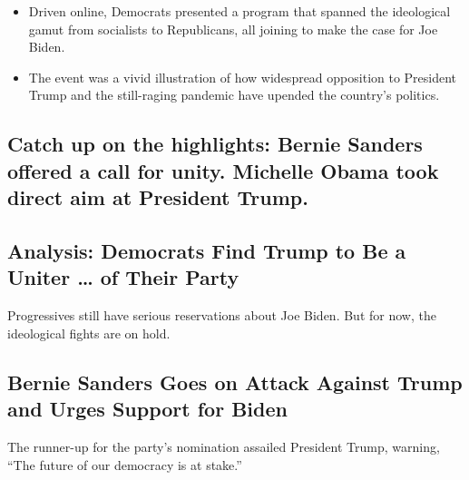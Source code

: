 \begin{itemize}
\tightlist
\item
  Driven online, Democrats presented a program that spanned the
  ideological gamut from socialists to Republicans, all joining to make
  the case for Joe Biden.
\item
  The event was a vivid illustration of how widespread opposition to
  President Trump and the still-raging pandemic have upended the
  country's politics.
\end{itemize}

\href{https://www.nytimes3xbfgragh.onion/live/2020/08/17/us/dnc-convention}{}

\hypertarget{catch-up-on-the-highlights-bernie-sanders-offered-a-call-for-unity-michelle-obama-took-direct-aim-at-president-trump}{%
\subsection{Catch up on the highlights: Bernie Sanders offered a call
for unity. Michelle Obama took direct aim at President
Trump.}\label{catch-up-on-the-highlights-bernie-sanders-offered-a-call-for-unity-michelle-obama-took-direct-aim-at-president-trump}}

\href{/2020/08/17/us/politics/convention-democratic-night-1.html}{}

\hypertarget{analysis-democrats-find-trump-to-be-a-uniter--of-their-party}{%
\subsection{Analysis: Democrats Find Trump to Be a Uniter \ldots{} of
Their
Party}\label{analysis-democrats-find-trump-to-be-a-uniter--of-their-party}}

Progressives still have serious reservations about Joe Biden. But for
now, the ideological fights are on hold.

\href{/2020/08/17/us/politics/bernie-sanders-democratic-convention.html}{}

\hypertarget{bernie-sanders-goes-on-attack-against-trump-and-urges-support-for-biden}{%
\subsection{Bernie Sanders Goes on Attack Against Trump and Urges
Support for
Biden}\label{bernie-sanders-goes-on-attack-against-trump-and-urges-support-for-biden}}

The runner-up for the party's nomination assailed President Trump,
warning, ``The future of our democracy is at stake.''

